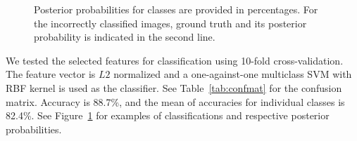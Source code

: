 \documentclass[hyperfootnotes=false]{article}
\begin{document}
\begin{figure}
	
	\vspace{-2mm}
	\caption{
		Posterior probabilities for classes are provided in percentages.
		For the incorrectly classified images, ground truth and its posterior probability is indicated in the second line.
	}
	\label{fig:qual}
\end{figure}

We tested the selected features for classification using 10-fold cross-validation.
The feature vector is $L2$ normalized and a one-against-one multiclass SVM with RBF kernel is used as the classifier.
See Table~\ref{tab:confmat} for the confusion matrix.
Accuracy is 88.7\%, and the mean of accuracies for individual classes is 82.4\%.
See Figure~\ref{fig:qual} for examples of classifications and respective posterior probabilities.
\end{document}
